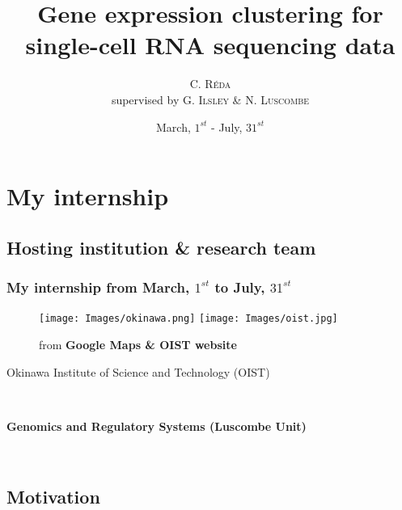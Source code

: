 \documentclass{beamer}
\title{Gene expression clustering for single-cell RNA sequencing data}
\author{C. \textsc{Réda}\\supervised by G. \textsc{Ilsley} \& N. \textsc{Luscombe}}
\institute{OIST, \textbf{Genomics and Regulatory Systems} Unit, Japan}
\date{March, $1^{st}$ - July, $31^{st}$}
\begin{document}
\maketitle
\tableofcontents
\setlength{\parindent}{1cm}


\section{My internship}

\begin{frame}
\tableofcontents[currentsection]
\end{frame}

\subsection{Hosting institution \& research team}

\begin{frame}
\frametitle{My internship from March, $1^{st}$ to July, $31^{st}$}

\begin{center}

\begin{figure}
\centering
\subfigure\texttt{[image: Images/okinawa.png]}
\subfigure\texttt{[image: Images/oist.jpg]}
\caption{from \textbf{Google Maps \& OIST website}}
\end{figure}

\begin{flushcenter} Okinawa Institute of Science and Technology (OIST) \end{flushcenter}\\
\pause
\begin{flushcenter} \bf Genomics and Regulatory Systems (Luscombe Unit) \end{flushcenter}\\
\end{center}

\end{frame}

\subsection{Motivation}
\end{document}
